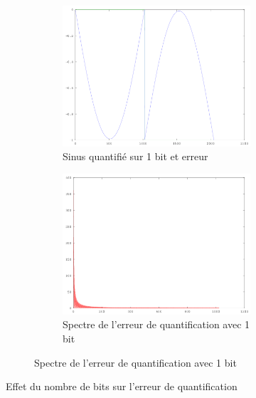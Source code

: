\documentclass{article}
\begin{document}
\begin{figure}[]
	\\
	\begin{subfigure}[b]{\textwidth}
		\begin{subfigure}[b]{.45\textwidth}
			\centering
			\includegraphics[width=\textwidth]{err_quantif_1bit_t}
			\caption{Sinus quantifié sur 1 bit et erreur}
			\label{fig:q_1a}
		\end{subfigure}
		\hfill
		\begin{subfigure}[b]{.45\textwidth}
			\centering
			\includegraphics[width=\textwidth]{err_quantif_1bit_f}
			\caption{Spectre de l'erreur de quantification avec 1 bit}
			\label{fig:q_1b}
		\end{subfigure}
	\end{subfigure}	
	\caption{Effet du nombre de bits sur l'erreur de quantification}
\end{figure}
\end{document}
